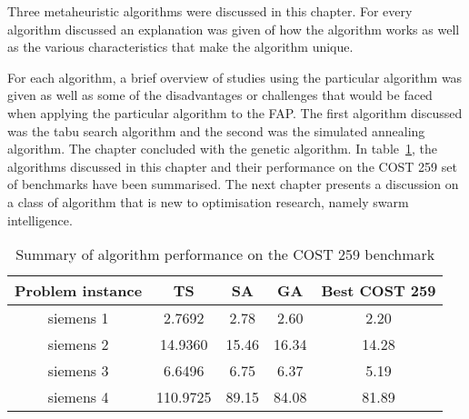 Three metaheuristic algorithms were discussed in this chapter. For every algorithm discussed an explanation was given of how the algorithm works as well as the various characteristics that make the algorithm unique.

For each algorithm, a brief overview of studies using the particular algorithm was given as well as some of the disadvantages or challenges that would be faced when applying the particular algorithm to the \gls{FAP}.
The first algorithm discussed was the tabu search algorithm and the second was the simulated annealing algorithm. The chapter concluded with the genetic algorithm. 
In table~\ref{tab:summary1}, the algorithms discussed in this chapter and their performance on the \gls{COST} 259 set of benchmarks have been summarised.
The next chapter presents a discussion on a class of algorithm that is new to optimisation research, namely swarm intelligence.
\begin{table}[H]
\label{tbl:summaryMetaTable}
\begin{center}
	\begin{tabular}{| c | c | c | c | c |}
	\hline
	Problem instance & \gls{TS} & \gls{SA} & \gls{GA} & Best \gls{COST} 259 \\ \hline
	siemens 1 & 2.7692 & 2.78 & 2.60 & 2.20 \\ \hline
	siemens 2 & 14.9360 & 15.46 & 16.34 & 14.28 \\ \hline
	siemens 3 & 6.6496 & 6.75 & 6.37 & 5.19 \\ \hline
	siemens 4 & 110.9725 & 89.15 & 84.08 & 81.89 \\ \hline
	\end{tabular}
\caption{Summary of algorithm performance on the \gls{COST} 259 benchmark}
\label{tab:summary1}
\end{center}
\end{table}

